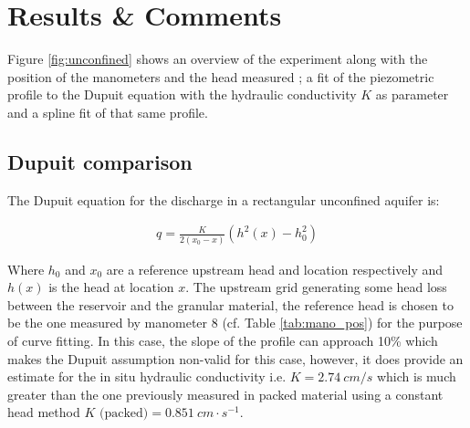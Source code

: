 \documentclass[
10pt, %
letterpaper, %
twoside, %
headinclude,footinclude, %
]{scrartcl}
\begin{document}
\begin{table}[h]
	\centering
	\caption{Location of manometers and piezometric head reading}
	\label{tab:mano_pos}
\end{table}

\section{Results \& Comments}

Figure \ref{fig:unconfined} shows an overview of the experiment along with the position of the manometers and the head measured ; a fit of the piezometric profile to the Dupuit equation with the hydraulic conductivity $K$ as parameter and a spline fit of that same profile. 

\subsection{Dupuit comparison}

The Dupuit equation for the discharge in a rectangular unconfined aquifer is:

\begin{align}
q = \frac{K}{2 \left(x_0 - x\right)}\left(h^2(x) - h_0^2\right)
\end{align}

Where $h_0$ and $x_0$ are a reference upstream head and location respectively and $h(x)$ is the head at location $x$. The upstream grid generating some head loss between the reservoir and the granular material, the reference head is chosen to be the one measured by manometer 8 (cf. Table \ref{tab:mano_pos}) for the purpose of curve fitting. In this case, the slope of the profile can approach 10\% which makes the Dupuit assumption non-valid for this case, however, it does provide an estimate for the in situ hydraulic conductivity i.e. $K = \SI{2.74}{cm/s}$ which is much greater than the one previously measured in packed material using a constant head method $K \text{ (packed)} = \SI{0.851}{cm \cdot s^{-1}}$.
\end{document}
